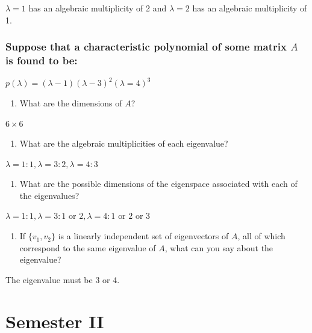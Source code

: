 \documentclass[
  letterpaper,
  DIV=11,
  numbers=noendperiod]{scrartcl}
\providecommand{\tightlist}{%
  \setlength{\itemsep}{0pt}\setlength{\parskip}{0pt}}\usepackage{longtable,booktabs,array}
\begin{document}
\(\lambda=1\) has an algebraic multiplicity of 2 and \(\lambda=2\) has
an algebraic multiplicity of 1.

\hypertarget{suppose-that-a-characteristic-polynomial-of-some-matrix-a-is-found-to-be}{%
\subsubsection{\texorpdfstring{Suppose that a characteristic polynomial
of some matrix \(A\) is found to
be:}{Suppose that a characteristic polynomial of some matrix A is found to be:}}\label{suppose-that-a-characteristic-polynomial-of-some-matrix-a-is-found-to-be}}

\(p(\lambda) = (\lambda-1)(\lambda-3)^2(\lambda=4)^3\)

\begin{enumerate}
\def\labelenumi{\alph{enumi}.}
\tightlist
\item
  What are the dimensions of \(A\)?
\end{enumerate}

\(6\times6\)

\begin{enumerate}
\def\labelenumi{\alph{enumi}.}
\setcounter{enumi}{1}
\tightlist
\item
  What are the algebraic multiplicities of each eigenvalue?
\end{enumerate}

\(\lambda=1: 1, \lambda=3:2, \lambda=4:3\)

\begin{enumerate}
\def\labelenumi{\alph{enumi}.}
\setcounter{enumi}{2}
\tightlist
\item
  What are the possible dimensions of the eigenspace associated with
  each of the eigenvalues?
\end{enumerate}

\(\lambda=1:1, \lambda=3:1 \text{ or } 2, \lambda=4:1 \text{ or } 2 \text{ or } 3\)

\begin{enumerate}
\def\labelenumi{\alph{enumi}.}
\setcounter{enumi}{3}
\tightlist
\item
  If \(\{v_1, v_2\}\) is a linearly independent set of eigenvectors of
  \(A\), all of which correspond to the same eigenvalue of \(A\), what
  can you say about the eigenvalue?
\end{enumerate}

The eigenvalue must be 3 or 4.

\hypertarget{semester-ii}{%
\section{Semester II}\label{semester-ii}}
\end{document}
